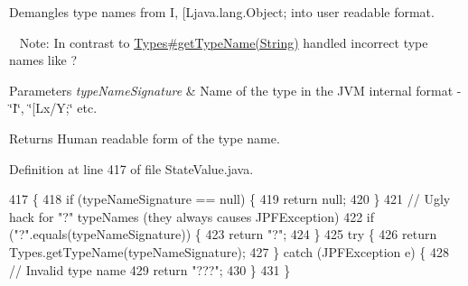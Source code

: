 Demangles type names from I, \mbox{[}Ljava.\+lang.\+Object; into user readable format. 

~\newline
Note\+: In contrast to \hyperlink{}{Types\#get\+Type\+Name(\+String)} handled incorrect type names like \textquotesingle{}?\textquotesingle{}


\begin{DoxyParams}{Parameters}
{\em type\+Name\+Signature} & Name of the type in the J\+VM internal format -\/ \char`\"{}\+I\char`\"{}, \char`\"{}\mbox{[}\+Lx/\+Y;\char`\"{} etc. \\
\hline
\end{DoxyParams}
\begin{DoxyReturn}{Returns}
Human readable form of the type name. 
\end{DoxyReturn}


Definition at line 417 of file State\+Value.\+java.


\begin{DoxyCode}
417                                                                    \{
418     \textcolor{keywordflow}{if} (typeNameSignature == null) \{
419       \textcolor{keywordflow}{return} null;
420     \}
421     \textcolor{comment}{// Ugly hack for "?" typeNames (they always causes JPFException)}
422     \textcolor{keywordflow}{if} (\textcolor{stringliteral}{"?"}.equals(typeNameSignature)) \{
423       \textcolor{keywordflow}{return} \textcolor{stringliteral}{"?"};
424     \}
425     \textcolor{keywordflow}{try} \{
426       \textcolor{keywordflow}{return} Types.getTypeName(typeNameSignature);
427     \} \textcolor{keywordflow}{catch} (JPFException e) \{
428       \textcolor{comment}{// Invalid type name}
429       \textcolor{keywordflow}{return} \textcolor{stringliteral}{"???"};
430     \}
431   \}
\end{DoxyCode}
